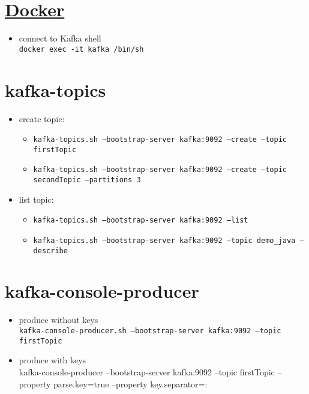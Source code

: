 \documentclass{article}
\begin{document}
\section{\href{https://towardsdatascience.com/how-to-install-apache-kafka-using-docker-the-easy-way-4ceb00817d8b}{Docker}}

\begin{itemize}
\item connect to Kafka shell\\
\texttt{docker exec -it kafka /bin/sh}
\end{itemize}

\section{kafka-topics}
\begin{itemize}
\item create topic:
\begin{itemize}
\item \texttt{kafka-topics.sh --bootstrap-server kafka:9092 --create --topic firstTopic}
\item \texttt{kafka-topics.sh --bootstrap-server kafka:9092 --create --topic secondTopic --partitions 3}
\end{itemize}
\item list topic: 
\begin{itemize}
\item \texttt{kafka-topics.sh --bootstrap-server kafka:9092 --list}
\item \texttt{kafka-topics.sh --bootstrap-server kafka:9092 --topic demo\_java --describe}
\end{itemize}

\end{itemize}

\section{kafka-console-producer}
\begin{itemize}
\item produce without keys\\
\texttt{kafka-console-producer.sh --bootstrap-server kafka:9092 --topic firstTopic}
\item produce with keys\\
kafka-console-producer --bootstrap-server kafka:9092 --topic firstTopic --property parse.key=true --property key.separator=:
\end{itemize}
\end{document}
